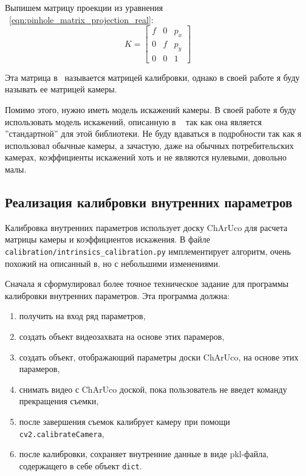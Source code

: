 \documentclass[12pt, a4paper]{article}
\begin{document}
Выпишем матрицу проекции из уравнения ~\eqref{eqn:pinhole_matrix_projection_real}:
\begin{equation}
    K = \begin{bmatrix}
        f & 0 & p_x\\
        0 & f & p_y\\
        0 & 0 & 1
    \end{bmatrix}
\end{equation}

Эта матрица в~\cite{multiview_cv} называется матрицей калибровки, однако в своей
работе я буду называть ее матрицей камеры. 

Помимо этого, нужно иметь модель искажений камеры.
В своей работе я буду использовать модель искажений, описанную в
~\cite{opencv_calibration_tutorial} так как она является ''стандартной'' для этой
библиотеки.  Не буду вдаваться в подробности так как я использовал обычные
камеры, а зачастую, даже на обычных потребительских камерах, коэффициенты
искажений хоть и не являются нулевыми, довольно малы.

\subsection{Реализация калибровки внутренних параметров}
\label{sec:camera_intrinsics_calibration}
Калибровка внутренних параметров использует доску ChArUco для расчета матрицы
камеры и коэффициентов искажения. В файле
\texttt{calibration/intrinsics\_calibration.py} имплементирует алгоритм, очень
похожий на описанный в\cite{opencv_calibration_tutorial}, но с небольшими
изменениями.



Сначала я сформулировал более точное техническое задание для программы калибровки внутренних параметров. 
Эта программа должна:
\begin{enumerate}
  \item получить на вход ряд параметров,
  \item создать объект видеозахвата на основе этих парамеров,
  \item создать объект, отображающий параметры доски ChArUco, на основе этих парамеров,
  \item снимать видео с ChArUco доской, пока пользователь не введет команду прекращения съемки,
  \item после завершения съемок калибрует камеру при помощи \texttt{cv2.calibrateCamera},
  \item после калибровки, сохраняет внутренние данные в виде pkl-файла, содержащего в себе объект \texttt{dict}.
\end{enumerate}
\end{document}
